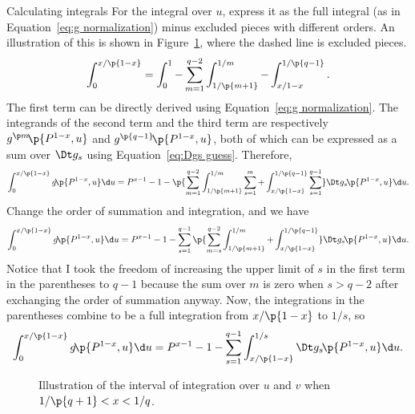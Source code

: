 \documentclass[oneside,12pt,final]{ucthesis-CA2012}
\newcommand{\dfr}{\dfrac}
\newcommand{\fc}[2]{#1\mathchoice{\!}{\!}{}{}\p{#2}} %
\begin{document}
\begin{mainmatter}
\begin{section}{Calculating integrals}
For the integral over $u$, express it as the full integral
(as in Equation~\ref{eq:g normalization}) minus excluded pieces with different orders.
An illustration of this is shown in Figure~\ref{fig:int pieces},
where the dashed line is excluded pieces.
\[\int_0^{x/\p{1-x}}
=\int_0^1-\sum_{m=1}^{q-2}\int_{1/\p{m+1}}^{1/m}-\int_{x/{1-x}}^{1/\p{q-1}}.\]
The first term can be directly derived using Equation~\ref{eq:g normalization}.
The integrands of the second term and the third term are respectively
$\fc{g^{\p m}}{P^{1-x},u}$ and $\fc{g^{\p{q-1}}}{P^{1-x},u}$,
both of which can be expressed as a sum over $\Dt g_s$ using Equation~\ref{eq:Dgs guess}.
Therefore,
\[\int_0^{x/\p{1-x}}\fc g{P^{1-x},u}\d u
=P^{x-1}-1-\p{\sum_{m=1}^{q-2}\int_{1/\p{m+1}}^{1/m}\sum_{s=1}^m
+\int_{x/\p{1-x}}^{1/\p{q-1}}\sum_{s=1}^{q-1}}\fc{\Dt g_s}{P^{1-x},u}\d u.\]
Change the order of summation and integration, and we have
\[\int_0^{x/\p{1-x}}\fc g{P^{1-x},u}\d u
=P^{x-1}-1-\sum_{s=1}^{q-1}\p{\sum_{m=s}^{q-2}\int_{1/\p{m+1}}^{1/m}
+\int_{x/\p{1-x}}^{1/\p{q-1}}}\fc{\Dt g_s}{P^{1-x},u}\d u.\]
Notice that I took the freedom of increasing the upper limit of $s$ in the first term
in the parentheses to $q-1$ because the sum over $m$ is zero when $s>q-2$
after exchanging the order of summation anyway.
Now, the integrations in the parentheses combine to be a full integration
from $x/\p{1-x}$ to $1/s$, so
\begin{equation}
	\label{eq:u int guess}
	\int_0^{x/\p{1-x}}\fc g{P^{1-x},u}\d u
	=P^{x-1}-1-\sum_{s=1}^{q-1}\int_{x/\p{1-x}}^{1/s}\fc{\Dt g_s}{P^{1-x},u}\d u.
\end{equation}

\begin{figure}[h!]
	\centering
	\caption{Illustration of the interval of integration over $u$ and $v$ when $1/\p{q+1}<x<1/q$.}
	\label{fig:int pieces}
\end{figure}


\end{section}
\end{mainmatter}
\end{document}
